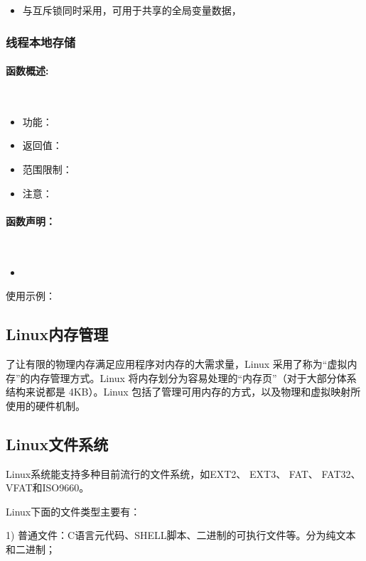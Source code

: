 \documentclass[UTF8]{article}%
\begin{document}
\begin{itemize}
    \item 与互斥锁同时采用，可用于共享的全局变量数据，
\end{itemize}

\subsubsection{线程本地存储}

\paragraph{函数概述:}~{}

\begin{itemize}
    \item 功能：
    \item 返回值：
    \item 范围限制：
    \item 注意：
\end{itemize}

\paragraph{函数声明：}~{}



\begin{itemize}
    \item 
\end{itemize}

使用示例：

\subsection{Linux内存管理}

了让有限的物理内存满足应用程序对内存的大需求量，Linux 采用了称为“虚拟内存”的内存管理方式。Linux 将内存划分为容易处理的“内存页”（对于大部分体系结构来说都是 4KB）。Linux 包括了管理可用内存的方式，以及物理和虚拟映射所使用的硬件机制。

\subsection{Linux文件系统}

Linux系统能支持多种目前流行的文件系统，如EXT2、 EXT3、 FAT、 FAT32、 VFAT和ISO9660。

Linux下面的文件类型主要有：

1) 普通文件：C语言元代码、SHELL脚本、二进制的可执行文件等。分为纯文本和二进制；
\end{document}
